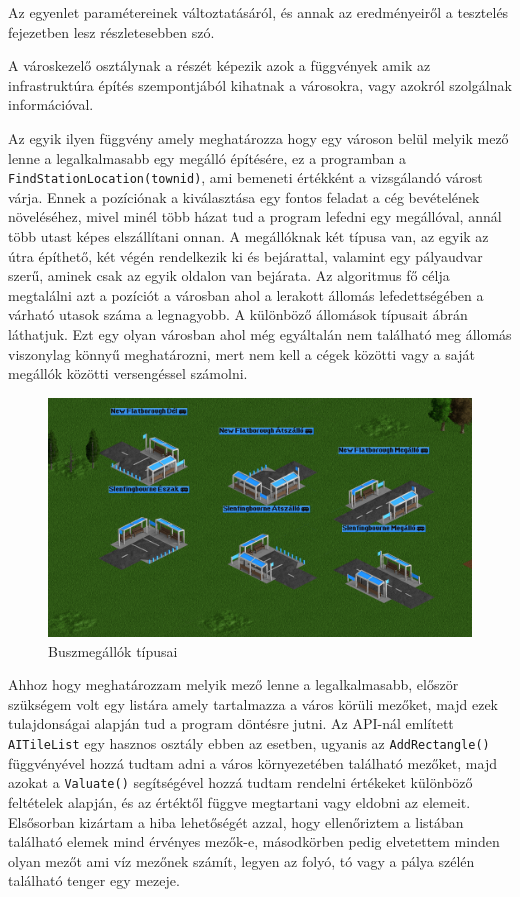 Az egyenlet paramétereinek változtatásáról, és annak az eredményeiről a tesztelés fejezetben lesz részletesebben szó.


A városkezelő osztálynak a részét képezik azok a függvények amik az infrastruktúra építés szempontjából kihatnak a városokra, vagy azokról szolgálnak információval.

Az egyik ilyen függvény amely meghatározza hogy egy városon belül melyik mező lenne a legalkalmasabb egy megálló építésére, ez a programban a \\ \texttt{FindStationLocation(townid)}, ami bemeneti értékként a vizsgálandó várost várja. Ennek a pozíciónak a kiválasztása egy fontos feladat a cég bevételének növeléséhez, mivel minél több házat tud a program lefedni egy megállóval, annál több utast képes elszállítani onnan. A megállóknak két típusa van, az egyik az útra építhető, két végén rendelkezik ki és bejárattal, valamint egy pályaudvar szerű, aminek csak az egyik oldalon van bejárata. Az algoritmus fő célja megtalálni azt a pozíciót a városban ahol a lerakott állomás lefedettségében a várható utasok száma a legnagyobb. A különböző állomások típusait  ábrán láthatjuk. Ezt egy olyan városban ahol még egyáltalán nem található meg állomás viszonylag könnyű meghatározni, mert nem kell a cégek közötti vagy a saját megállók közötti versengéssel számolni.

\begin{figure}
	\centering
	\includegraphics[scale=0.4]{images/megallok.png}
	\caption{Buszmegállók típusai}
	\label{fig:megallok}
\end{figure}

Ahhoz hogy meghatározzam melyik mező lenne a legalkalmasabb, először szükségem volt egy listára amely tartalmazza a város körüli mezőket, majd ezek tulajdonságai alapján tud a program döntésre jutni. Az API-nál említett \texttt{AITileList} egy hasznos osztály ebben az esetben, ugyanis az \texttt{AddRectangle()} függvényével hozzá tudtam adni a város környezetében található mezőket, majd azokat a \texttt{Valuate()} segítségével hozzá tudtam rendelni értékeket különböző feltételek alapján, és az értéktől függve megtartani vagy eldobni az elemeit. Elsősorban kizártam a hiba lehetőségét azzal, hogy ellenőriztem a listában található elemek mind érvényes mezők-e, másodkörben pedig elvetettem minden olyan mezőt ami víz mezőnek számít, legyen az folyó, tó vagy a pálya szélén található tenger egy mezeje.

